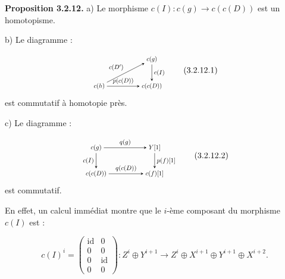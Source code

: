 \clearpage
{}%
\begingroup
\setlength{\abovedisplayskip}{4pt plus 2pt minus 2pt}%
\setlength{\belowdisplayskip}{4pt plus 2pt minus 2pt}%
\noindent\textbf{Proposition 3.2.12.}\quad
{}
a) Le morphisme
$c(I)\colon c(g)\longrightarrow c(c(D))$ est un homotopisme.

b) Le diagramme :

\begin{equation}
  \begin{tikzpicture}[>=stealth,baseline=(current bounding box.center),scale=0.74,
    every node/.style={transform shape}]
    \node (Ch) at (0,0) {$c(h)$};
    \node (Cg) at (3.0,1.55) {$c(g)$};
    \node (CcD) at (3.0,0) {$c(c(D))$};
    \draw[->] (Ch) -- node[above left] {$c(D')$} (Cg);
    \draw[->] (Cg) -- node[right] {$c(I)$} (CcD);
    \draw[->] (Ch) -- node[above] {$p(c(D))$} (CcD);
  \end{tikzpicture}
  \tag{3.2.12.1}
\end{equation}
est commutatif à homotopie près.

c) Le diagramme :

\begin{equation}
  \begin{tikzpicture}[>=stealth,baseline=(current bounding box.center),scale=0.76,
    every node/.style={transform shape}]
    \node (Cg) at (0,1.45) {$c(g)$};
    \node (Y) at (3.25,1.45) {$Y[1]$};
    \node (CcD) at (0,0) {$c(c(D))$};
    \node (Cf) at (3.25,0) {$c(f)[1]$};
    \draw[->] (Cg) -- node[above] {$q(g)$} (Y);
    \draw[->] (Cg) -- node[left] {$c(I)$} (CcD);
    \draw[->] (Y) -- node[right] {$p(f)[1]$} (Cf);
    \draw[->] (CcD) -- node[above] {$q(c(D))$} (Cf);
  \end{tikzpicture}
  \tag{3.2.12.2}
\end{equation}
est commutatif.

En effet, un calcul immédiat montre que le $i$-ème composant du morphisme
$c(I)$ est :

\begin{equation}
  c(I)^i=
  \begin{pmatrix}
    \operatorname{id}&0\\
    0&0\\
    0&\operatorname{id}\\
    0&0
  \end{pmatrix}
  \colon Z^i\oplus Y^{i+1}\longrightarrow
  Z^i\oplus X^{i+1}\oplus Y^{i+1}\oplus X^{i+2}.
  \tag{3.2.12.3}
\end{equation}

